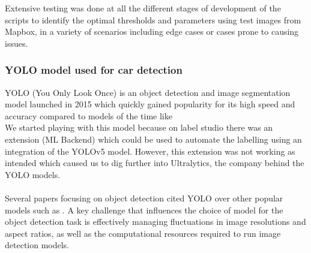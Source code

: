 Extensive testing was done at all the different stages of development of the scripts to identify the optimal thresholds and parameters using test images from Mapbox, in a variety of scenarios including edge cases or cases prone to causing issues.

\subsubsection{YOLO model used for car detection}
YOLO (You Only Look Once) is an object detection and image segmentation model launched in 2015 which quickly gained popularity for its high speed and accuracy compared to models of the time like \\
We started playing with this model because on label studio there was an extension (ML Backend) which could be used to automate the labelling using an integration of the YOLOv5 model. However, this extension was not working as intended which caused us to dig further into Ultralytics, the company behind the YOLO models.\\ \\
Several papers focusing on object detection cited YOLO over other popular models such as . A key challenge that influences the choice of model for the object detection task is effectively managing fluctuations in image resolutions and aspect ratios, as well as the computational resources required to run image detection models.\\

